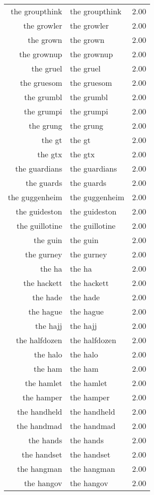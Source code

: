 \begin{table}[ht]
\begin{tabular}{rlr}
  the groupthink & the groupthink & 2.00 \\ 
  the growler & the growler & 2.00 \\ 
  the grown & the grown & 2.00 \\ 
  the grownup & the grownup & 2.00 \\ 
  the gruel & the gruel & 2.00 \\ 
  the gruesom & the gruesom & 2.00 \\ 
  the grumbl & the grumbl & 2.00 \\ 
  the grumpi & the grumpi & 2.00 \\ 
  the grung & the grung & 2.00 \\ 
  the gt & the gt & 2.00 \\ 
  the gtx & the gtx & 2.00 \\ 
  the guardians & the guardians & 2.00 \\ 
  the guards & the guards & 2.00 \\ 
  the guggenheim & the guggenheim & 2.00 \\ 
  the guideston & the guideston & 2.00 \\ 
  the guillotine & the guillotine & 2.00 \\ 
  the guin & the guin & 2.00 \\ 
  the gurney & the gurney & 2.00 \\ 
  the ha & the ha & 2.00 \\ 
  the hackett & the hackett & 2.00 \\ 
  the hade & the hade & 2.00 \\ 
  the hague & the hague & 2.00 \\ 
  the hajj & the hajj & 2.00 \\ 
  the halfdozen & the halfdozen & 2.00 \\ 
  the halo & the halo & 2.00 \\ 
  the ham & the ham & 2.00 \\ 
  the hamlet & the hamlet & 2.00 \\ 
  the hamper & the hamper & 2.00 \\ 
  the handheld & the handheld & 2.00 \\ 
  the handmad & the handmad & 2.00 \\ 
  the hands & the hands & 2.00 \\ 
  the handset & the handset & 2.00 \\ 
  the hangman & the hangman & 2.00 \\ 
  the hangov & the hangov & 2.00 \\ 

\end{tabular}
\end{table}
